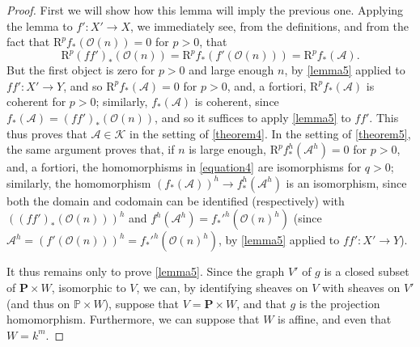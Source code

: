 \documentclass{article}
\theoremstyle{plain}
\theoremstyle{definition}
\newcommand{\sh}{\mathscr}
\newcommand{\cat}{\mathcal}
\newcommand{\RR}{\mathrm{R}}
\newcommand{\oldpage}[1]{\marginpar{\footnotesize$\Big\vert$ \textit{p.~#1}}}
\begin{document}
\begin{proof}
  First we will show how this lemma will imply the previous one.
  Applying the lemma to $f'\colon X'\to X$, we immediately see, from the definitions, and from the fact that $\RR^pf_*(\sh{O}(n))=0$ for $p>0$, that
  \[
    \RR^p(ff')_*(\sh{O}(n)) = \RR^pf_*(f'(\sh{O}(n))) = \RR^pf_*(\sh{A}).
  \]
\oldpage{2-12}
  But the first object is zero for $p>0$ and large enough $n$, by \cref{lemma5} applied to $ff'\colon X'\to Y$, and so $\RR^pf_*(\sh{A})=0$ for $p>0$, and, a fortiori, $\RR^pf_*(\sh{A})$ is coherent for $p>0$;
  similarly, $f_*(\sh{A})$ is coherent, since $f_*(\sh{A})=(ff')_*(\sh{O}(n))$, and so it suffices to apply \cref{lemma5} to $ff'$.
  This thus proves that $\sh{A}\in\cat{K}$ in the setting of \cref{theorem4}.
  In the setting of \cref{theorem5}, the same argument proves that, if $n$ is large enough, $\RR^pf_*^h(\sh{A}^h)=0$ for $p>0$, and, a fortiori, the homomorphisms in \cref{equation4} are isomorphisms for $q>0$;
  similarly, the homomorphism $(f_*(\sh{A}))^h\to f_*^h(\sh{A}^h)$ is an isomorphism, since both the domain and codomain can be identified (respectively) with $((ff')_*(\sh{O}(n)))^h$ and $f^h(\sh{A}^h)=f_*'^h(\sh{O}(n)^h)$ (since $\sh{A}^h=(f'(\sh{O}(n)))^h=f_*'^h(\sh{O}(n)^h)$, by \cref{lemma5} applied to $ff'\colon X'\to Y$).

  It thus remains only to prove \cref{lemma5}.
  Since the graph $V'$ of $g$ is a closed subset of $\mathbf{P}\times W$, isomorphic to $V$, we can, by identifying sheaves on $V$ with sheaves on $V'$ (and thus on $\mathbb{P}\times W$), suppose that $V=\mathbf{P}\times W$, and that $g$ is the projection homomorphism.
  Furthermore, we can suppose that $W$ is affine, and even that $W=k^m$.


\end{proof}
\end{document}
